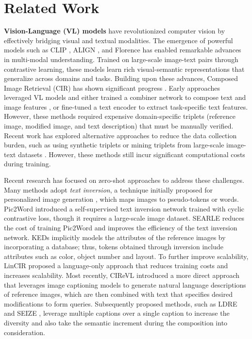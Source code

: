 \section{Related Work}
\label{sec:lit}
\textbf{Vision-Language (VL) models} have revolutionized computer vision by effectively bridging visual and textual modalities. The emergence of powerful models such as CLIP \cite{radford2021learning}, ALIGN \cite{jia2021scaling}, and Florence \cite{yuan2021florence} has enabled remarkable advances in multi-modal understanding. Trained on large-scale image-text pairs through contrastive learning, these models learn rich visual-semantic representations that generalize across domains and tasks.
Building upon these advances, Composed Image Retrieval (CIR) has shown significant progress \cite{baldrati2022effective,saito2023pic2word,karthik2024visionbylanguage}. Early approaches leveraged VL models and either trained a combiner network to compose text and image features \cite{baldrati2022effective}, or fine-tuned a text encoder \cite{baldrati2022conditioned} to extract task-specific text features. However, these methods required expensive domain-specific triplets (reference image, modified image, and text description) that must be manually verified. Recent work has explored alternative approaches to reduce the data collection burden, such as using synthetic triplets \cite{gu2023compodiff} or mining triplets from large-scale image-text datasets \cite{liu2023zeroshot}. However, these methods still incur significant computational costs during training.

 Recent research has focused on zero-shot approaches to address these challenges. Many methods adopt \textit{text inversion}, a technique initially proposed for personalized image generation \cite{gal2022textual,ruiz2023dreambooth}, which maps images to pseudo-tokens or words. Pic2Word \cite{saito2023pic2word} introduced a self-supervised text inversion network trained with cyclic contrastive loss, though it requires a large-scale image dataset. SEARLE \cite{baldrati2023zero} reduces the cost of training Pic2Word and improves the efficiency of the text inversion network. KEDs \cite{suo2024knowledge} implicitly models the attributes of the reference images by incorporating a database; thus, tokens obtained through inversion include attributes such as color, object number and layout. To further improve scalability, LinCIR \cite{gu2024lincir} proposed a language-only approach that reduces training costs and increases scalability. Most recently, CIReVL \cite{karthik2024visionbylanguage} introduced a more direct approach that leverages image captioning models to generate natural language descriptions of reference images, which are then combined with text that specifies desired modifications to form queries. Subsequently proposed methods, such as LDRE \cite{yang2024ldre} and SEIZE \cite{yang2024semantic}, leverage multiple captions over a single caption to increase the diversity and also take the semantic increment during the composition into consideration.

